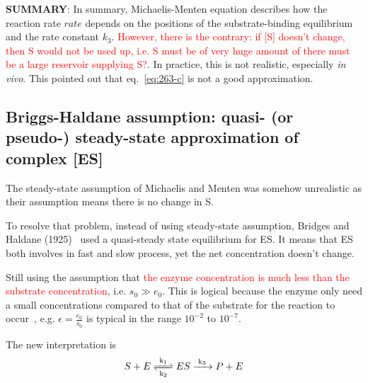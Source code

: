 {\bf SUMMARY}: In summary, Michaelis-Menten equation describes how the
reaction rate $rate$ depends on the positions of the substrate-binding
equilibrium and the rate constant $k_3$.
\textcolor{red}{However, there is the contrary: if [S] doesn't change,
  then S would not be used up, i.e. S must be of very huge amount of
  there must be a large reservoir supplying S?}.
In practice, this is not realistic, especially {\it in vivo}.  This
pointed out that eq.~\eqref{eq:263-c} is not a good approximation.  



\subsection[Briggs-Haldane assumption]{Briggs-Haldane assumption: quasi- (or
pseudo-) steady-state approximation of complex [ES]}
\label{sec:quasi-steady-state}
\label{sec:Michaelis-Menten-modified}

The steady-state assumption of Michaelis and Menten was somehow unrealistic as
their assumption means there is no change in S. 

To resolve that problem, instead of using steady-state assumption, Bridges and
Haldane (1925)~\citep{briggs1925nke} used a quasi-steady state equilibrium for
ES. It means that ES both involves in fast and slow process, yet the net
concentration doesn't change.

Still using the assumption that \textcolor{red}{the enzyme concentration is much
less than the substrate concentration}, i.e. $s_0\gg e_0$.
This is logical because the enzyme only need a small concentrations compared to
that of the substrate for the reaction to occur~\citep{li2008qssa}, e.g.
$\epsilon = \frac{e_0}{s_0}$ is typical in the range $10^{-2}$ to $10^{-7}$.


The new interpretation is
\begin{equation}
  \label{eq:289}
  S + E \ce{<=>[k_1][k_{2}]} ES \ce{->[k_3]} P + E
\end{equation}


